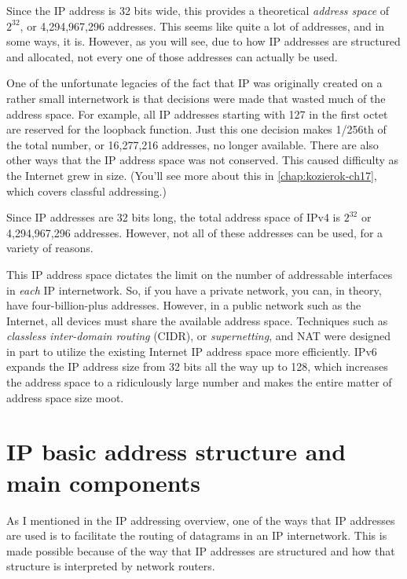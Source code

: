 Since the IP address is 32 bits wide, this provides a theoretical {\emph{address
space}} of $2^{32}$, or 4,294,967,296 addresses.
This seems like quite a lot of addresses, and in some ways, it is.
However, as you will see, due to how IP addresses are structured and allocated, not every one of those addresses can actually be used.

One of the unfortunate legacies of the fact that IP was originally
created on a rather small internetwork is that decisions were made that
wasted much of the address space. For example, all IP addresses starting
with 127 in the first octet are reserved for the loopback function. Just
this one decision makes 1/256th of the total number, or 16,277,216
addresses, no longer available. There are also other ways that the IP
address space was not conserved. This caused difficulty as the Internet
grew in size. (You'll see more about this in \vref{chap:kozierok-ch17}, which covers classful addressing.)


\begin{keyconcept}
Since IP addresses are 32 bits long, the total address space of IPv4 is $2^{32}$ or 4,294,967,296 addresses.
However, not all of these addresses can be used, for a variety of reasons.
\end{keyconcept}

This IP address space dictates the limit on the number of addressable
interfaces in \emph{each} IP internetwork. So, if you have a private
network, you can, in theory, have four-billion-plus addresses. However,
in a public network such as the Internet, all devices must share the
available address space. Techniques such as \emph{classless inter-domain routing} (CIDR), or \emph{supernetting}, and NAT were designed in part to
utilize the existing Internet IP address space more efficiently.
IPv6 expands the IP address size from 32 bits all the way up to 128, which increases the address space to a ridiculously large number and makes the entire matter of address space size moot.



\section{IP basic address structure and main components}

As I mentioned in the IP addressing overview, one of the ways that IP addresses are used is to facilitate the routing of datagrams in an IP internetwork.
This is made possible because of the way that IP addresses are structured and how that structure is interpreted by network routers.



